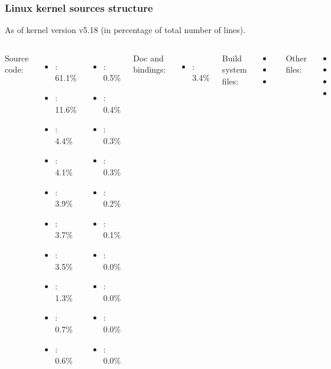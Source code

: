 \begin{frame}
  \frametitle{Linux kernel sources structure}
  As of kernel version v5.18 (in percentage of total number of lines).
  \begin{columns}
    Source code:
    \begin{itemize}
    \item {}: 61.1\%
    \item {}: 11.6\%
    \item {}: 4.4\%
    \item {}: 4.1\%
    \item {}: 3.9\%
    \item {}: 3.7\%
    \item {}: 3.5\%
    \item {}: 1.3\%
    \item {}: 0.7\%
    \item {}: 0.6\%
    \end{itemize}
    \begin{itemize}
    \item {}: 0.5\%
    \item {}: 0.4\%
    \item {}: 0.3\%
    \item {}: 0.3\%
    \item {}: 0.2\%
    \item {}: 0.1\%
    \item {}: 0.0\%
    \item {}: 0.0\%
    \item {}: 0.0\%
    \item {}: 0.0\%
    \end{itemize}
    Doc and bindings:
    \begin{itemize}
    \item {}: 3.4\%
    \end{itemize}
    Build system files:
    \begin{itemize}
    \item {}
    \item {}
    \item {}
    \end{itemize}
    Other files:
    \begin{itemize}
    \item {}
    \item {}
    \item {}
    \item {}
    \end{itemize}
  \end{columns}
\end{frame}
